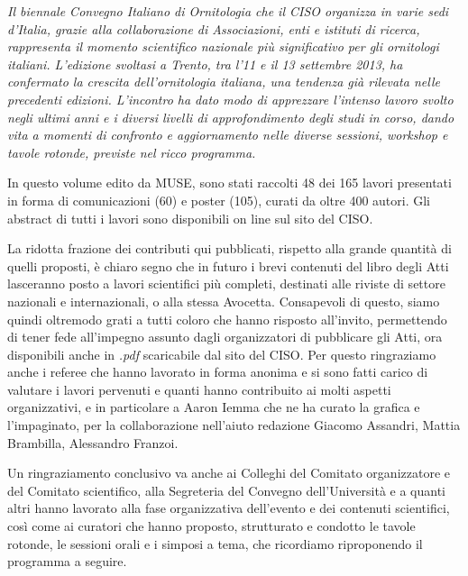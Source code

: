 \documentclass[10pt,twoside,openright,x11names,svgnames,italian,a4paper,dvipsnames,table]{memoir}
\begin{document}
{\large\itshape
Il biennale Convegno Italiano di Ornitologia che il CISO organizza in varie sedi d{\textquoteright}Italia, grazie alla collaborazione di Associazioni, enti e istituti di ricerca, rappresenta il momento scientifico nazionale pi\`u significativo per gli ornitologi italiani. L{\textquoteright}edizione svoltasi a Trento, tra l{\textquoteright}11 e il 13 settembre 2013, ha confermato la crescita dell{\textquoteright}ornitologia italiana, una tendenza gi\`a rilevata nelle precedenti edizioni. L{\textquoteright}incontro ha dato modo di apprezzare l{\textquoteright}intenso lavoro svolto negli ultimi anni e i diversi livelli di approfondimento degli studi in corso, dando vita a momenti di confronto e aggiornamento nelle diverse sessioni, workshop e tavole rotonde, previste nel ricco programma.


In questo volume edito da MUSE, sono stati raccolti 48 dei 165 lavori presentati in forma di comunicazioni (60) e poster (105), curati da oltre 400 autori. Gli abstract di tutti i lavori sono disponibili on line sul sito del CISO.


La ridotta frazione dei contributi qui pubblicati, rispetto alla grande quantit\`a di quelli proposti, \`e chiaro segno che in futuro i brevi contenuti del libro degli Atti lasceranno posto a lavori scientifici pi\`u completi, destinati alle riviste di settore nazionali e internazionali, o alla stessa Avocetta. Consapevoli di questo, siamo quindi oltremodo grati a tutti coloro che hanno risposto all{\textquoteright}invito, permettendo di tener fede all{\textquoteright}impegno assunto dagli organizzatori di pubblicare gli Atti, ora disponibili anche in \emph{.pdf} scaricabile dal sito del CISO. Per questo ringraziamo anche i referee che hanno lavorato in forma anonima e si sono fatti carico di valutare i lavori pervenuti e quanti hanno contribuito ai molti aspetti organizzativi, e in particolare a Aaron Iemma che ne ha curato la grafica e l{\textquoteright}impaginato, per la collaborazione nell{\textquoteright}aiuto redazione Giacomo Assandri, Mattia Brambilla, Alessandro Franzoi.


Un ringraziamento conclusivo va anche ai Colleghi del Comitato organizzatore e del Comitato scientifico, alla Segreteria del Convegno dell{\textquoteright}Universit\`a e a quanti altri hanno lavorato alla fase organizzativa dell{\textquoteright}evento e dei contenuti scientifici, cos\`i come ai curatori che hanno proposto, strutturato e condotto le tavole rotonde, le sessioni orali e i simposi a tema, che ricordiamo riproponendo il programma a seguire.
}
\end{document}
